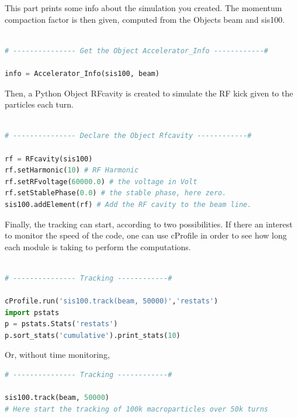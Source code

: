 This part prints some info about the simulation you created. The momentum compaction factor is then given, computed from the Objects beam and sis100.

\begin{lstlisting}[language=Python]

# --------------- Get the Object Accelerator_Info ------------#

info = Accelerator_Info(sis100, beam) 

\end{lstlisting}

Then, a Python Object RFcavity is created to simulate the RF kick given to the particles each turn.
\begin{lstlisting}[language=Python]

# --------------- Declare the Object Rfcavity ------------#

rf = RFcavity(sis100) 
rf.setHarmonic(10) # RF Harmonic
rf.setRFvoltage(60000.0) # the voltage in Volt
rf.setStablePhase(0.0) # the stable phase, here zero.
sis100.addElement(rf) # Add the RF cavity to the beam line.

\end{lstlisting}

Finally, the tracking can start, according to two possibilities. If there an interest to monitor the speed of the code, one can use cProfile in order to see how long each module is taking to perform the computations.

\begin{lstlisting}[language=Python]

# --------------- Tracking ------------#

cProfile.run('sis100.track(beam, 50000)','restats')
import pstats
p = pstats.Stats('restats')
p.sort_stats('cumulative').print_stats(10)

\end{lstlisting}

Or, without time monitoring,

\begin{lstlisting}[language=Python]
# --------------- Tracking ------------#

sis100.track(beam, 50000) 
# Here start the tracking of 100k macroparticles over 50k turns
\end{lstlisting}

